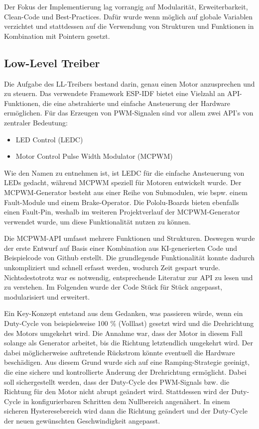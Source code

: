 Der Fokus der Implementierung lag vorrangig auf Modularität, Erweiterbarkeit, Clean-Code und Best-Practices. Dafür wurde wenn möglich auf globale Variablen verzichtet und stattdessen auf die Verwendung von Strukturen und Funktionen in Kombination mit Pointern gesetzt.

\subsection{Low-Level Treiber}

Die Aufgabe des LL-Treibers bestand darin, genau einen Motor anzusprechen und zu steuern. Das verwendete Framework ESP-IDF bietet eine Vielzahl an API-Funktionen, die eine abstrahierte und einfache Ansteuerung der Hardware ermöglichen. Für das Erzeugen von PWM-Signalen sind vor allem zwei API's von zentraler Bedeutung:

\begin{itemize}
    \item LED Control (LEDC)
    \item Motor Control Pulse Width Modulator (MCPWM)
\end{itemize}

Wie den Namen zu entnehmen ist, ist LEDC für die einfache Ansteuerung von LEDs gedacht, während MCPWM speziell für Motoren entwickelt wurde. Der MCPWM-Generator besteht aus einer Reihe von Submodulen, wie bspw. einem Fault-Module und einem Brake-Operator. Die Pololu-Boards bieten ebenfalls einen Fault-Pin, weshalb im weiteren Projektverlauf der MCPWM-Generator verwendet wurde, um diese Funktionalität nutzen zu können. \newline

Die MCPWM-API umfasst mehrere Funktionen und Strukturen. Deswegen wurde der erste Entwurf auf Basis einer Kombination aus KI-generierten Code und Beispielcode von Github erstellt. Die grundlegende Funktionalität konnte dadurch unkompliziert und schnell erfasst werden, wodurch Zeit gespart wurde. Nichtsdestotrotz war es notwendig, entsprechende Literatur zur API zu lesen und zu verstehen. Im Folgenden wurde der Code Stück für Stück angepasst, modularisiert und erweitert. \newline

Ein Key-Konzept entstand aus dem Gedanken, was passieren würde, wenn ein Duty-Cycle von beispielsweise 100 \% (Volllast) gesetzt wird und die Drehrichtung des Motors umgekehrt wird. Die Annahme war, dass der Motor in diesem Fall solange als Generator arbeitet, bis die Richtung letztendlich umgekehrt wird. Der dabei möglicherweise auftretende Rückstrom könnte eventuell die Hardware beschädigen. Aus diesem Grund wurde sich auf eine Ramping-Strategie geeinigt, die eine sichere und kontrollierte Änderung der Drehrichtung ermöglicht. Dabei soll sichergestellt werden, dass der Duty-Cycle des PWM-Signals bzw. die Richtung für den Motor nicht abrupt geändert wird. Stattdessen wird der Duty-Cycle in konfigurierbaren Schritten dem Nullbereich angenähert. In einem sicheren Hysteresebereich wird dann die Richtung geändert und der Duty-Cycle der neuen gewünschten Geschwindigkeit angepasst. \newline

